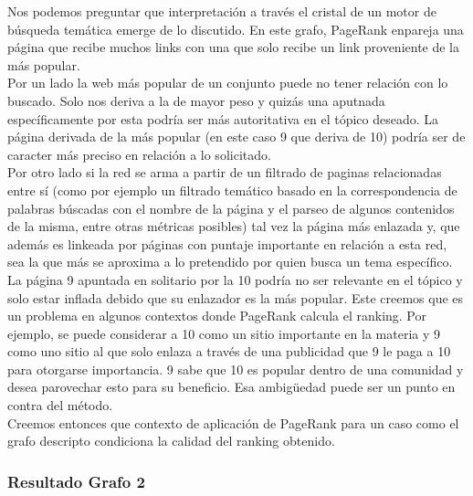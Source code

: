 Nos podemos preguntar que interpretación a través el cristal de un motor de búsqueda temática emerge de lo discutido. En este grafo, PageRank enpareja una página que recibe muchos links con una que solo recibe un link proveniente de la más popular. \\ 
Por un lado la web más popular de un conjunto puede no tener relación con lo buscado. Solo nos deriva a la de mayor peso y quizás una aputnada específicamente por esta podría ser más autoritativa en el tópico deseado. La página derivada de la más popular (en este caso 9 que deriva de 10) podría ser de caracter más preciso en relación a lo solicitado.\\

Por otro lado si la red se arma a partir de un filtrado de paginas relacionadas entre sí (como por ejemplo un filtrado temático basado en la correspondencia de palabras búscadas con el nombre de la página y el parseo de algunos contenidos de la misma, entre otras métricas posibles) tal vez la página más enlazada y, que además es linkeada por páginas con puntaje importante en relación a esta red, sea la que más se aproxima a lo pretendido por quien busca un tema específico.\\

La página 9 apuntada en solitario por la 10 podría no ser relevante en el tópico y solo estar inflada debido que su enlazador es la más popular. Este creemos que es un problema en algunos contextos donde PageRank calcula el ranking. Por ejemplo, se puede considerar a 10 como un sitio importante en la materia y 9 como uno sitio al que solo enlaza a través de una publicidad que 9 le paga a 10 para otorgarse importancia. 9 sabe que 10 es popular dentro de una comunidad y desea parovechar esto para su beneficio. Esa ambigüedad puede ser un punto en contra del método.\\

Creemos entonces que contexto de aplicación de PageRank para un caso como el grafo descripto condiciona la calidad del ranking obtenido. \\

\subsubsection{Resultado Grafo 2}

